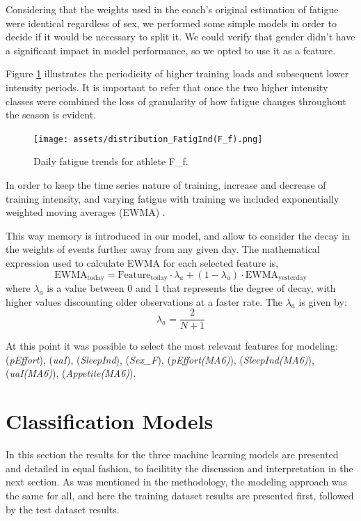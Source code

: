 \documentclass[conference]{IEEEtran}
\begin{document}
Considering that the weights used in the coach's original estimation of fatigue were identical regardless of sex, we performed some simple models in order to decide if it would be necessary to split it. We could verify that gender didn't have a significant impact in model performance, so we opted to use it as a feature. 

Figure \ref{fatig_Ff} illustrates the periodicity of higher training loads and subsequent lower intensity periods. It is important to refer that once the two higher intensity classes were combined the loss of granularity of how fatigue changes throughout the season is evident.  
\begin{figure}[H]
    \centering
    \texttt{[image: assets/distribution\_FatigInd(F\_f).png]}
    \caption{Daily fatigue trends for athlete F\_f.}
    \label{fatig_Ff}
\end{figure}

In order to keep the time series nature of training, increase and decrease of training intensity, and varying fatigue with training we included exponentially weighted moving averages (EWMA) \cite{Williams17}.

This way memory is introduced in our model, and allow to consider the decay in the weights of events further away from any given day. The mathematical expression used to calculate EWMA for each selected feature is,
\begin{equation*}
    \text{EWMA}_{\text{today}} = \text{Feature}_{\text{today}} \cdot \lambda_a + (1 - \lambda_a) \cdot \text{EWMA}_{\text{yesterday}}
\end{equation*}
where $\lambda_a$ is a value between 0 and 1 that represents the degree of decay, with higher values discounting older observations at a faster rate. The $\lambda_a$ is given by:
\begin{equation*}
    \lambda_a = \frac{2}{N + 1}
\end{equation*} 

At this point it was possible to select the most relevant features for modeling: (\textit{pEffort}), (\textit{uaI}), (\textit{SleepInd}), (\textit{Sex\_F}), (\textit{pEffort(MA6)}), (\textit{SleepInd(MA6)}), (\textit{uaI(MA6)}), (\textit{Appetite(MA6)}).

\section{Classification Models}

In this section the results for the three machine learning models are presented and detailed in equal fashion, to facilitity the discussion and interpretation in the next section. As was mentioned in the methodology, the modeling approach was the same for all, and here the training dataset results are presented first, followed by the test dataset results.
\end{document}
